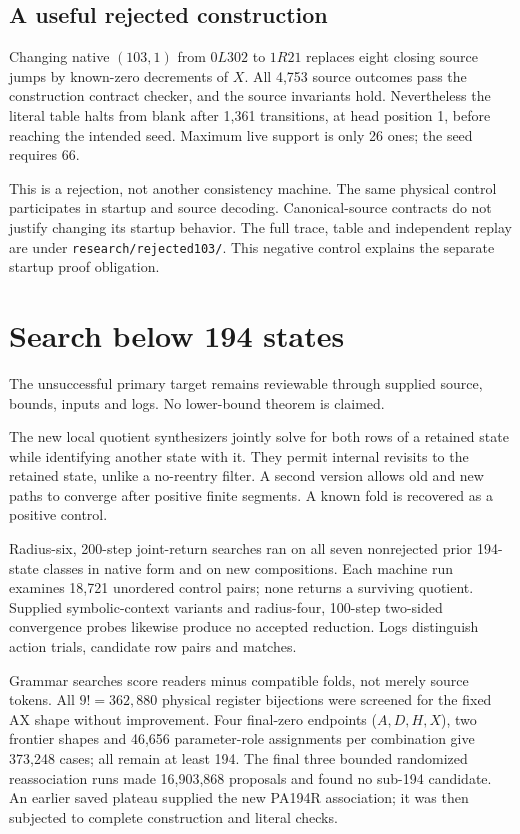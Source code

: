 \documentclass[11pt,letterpaper]{article}
\newcommand{\file}[1]{{\small\nolinkurl{#1}}}
\begin{document}
\subsection{A useful rejected construction}

Changing native $(103,1)$ from $0L302$ to $1R21$ replaces eight closing
source jumps by known-zero decrements of $X$. All 4,753 source outcomes
pass the construction contract checker, and the source invariants hold.
Nevertheless the literal table halts from blank after 1,361 transitions,
at head position 1, before reaching the intended seed. Maximum live
support is only 26 ones; the seed requires 66.

This is a rejection, not another consistency machine. The same physical
control participates in startup and source decoding. Canonical-source
contracts do not justify changing its startup behavior. The full trace,
table and independent replay are under \file{research/rejected103/}.
This negative control explains the separate startup proof obligation.

\section{Search below 194 states}
\label{sec:search}

The unsuccessful primary target remains reviewable through supplied
source, bounds, inputs and logs. No lower-bound theorem is claimed.

The new local quotient synthesizers jointly solve for both rows of a
retained state while identifying another state with it. They permit
internal revisits to the retained state, unlike a no-reentry filter.
A second version allows old and new paths to converge after positive
finite segments. A known fold is recovered as a positive control.

Radius-six, 200-step joint-return searches ran on all seven nonrejected
prior 194-state classes in native form and on new compositions.
Each machine run examines 18,721 unordered control pairs; none
returns a surviving quotient. Supplied symbolic-context variants and
radius-four, 100-step two-sided convergence probes likewise produce no
accepted reduction. Logs distinguish action trials, candidate row
pairs and matches.

Grammar searches score readers minus compatible folds, not merely
source tokens. All $9!=362{,}880$ physical register bijections were
screened for the fixed AX shape without improvement. Four final-zero
endpoints ($A,D,H,X$), two frontier shapes and 46,656 parameter-role
assignments per combination give 373,248 cases; all remain at least
194. The final three bounded randomized reassociation runs made
16,903,868 proposals and found no sub-194 candidate. An earlier saved
plateau supplied the new PA194R association; it was then subjected to
complete construction and literal checks.
\end{document}
